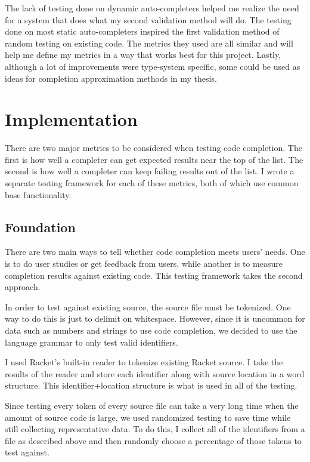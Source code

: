 \documentclass[ms,electronic,twosidetoc,letterpaper,chaptercenter,parttop,lol,lof,lot]{byumsphd}
\begin{document}
The lack of testing done on dynamic auto-completers helped me realize the need for a system that does what my second validation method will do. The testing done on most static auto-completers inspired the first validation method of random testing on existing code. The metrics they used are all similar and will help me define my metrics in a way that works best for this project. Lastly, although a lot of improvements were type-system specific, some could be used as ideas for completion approximation methods in my thesis.

\chapter{Implementation}

There are two major metrics to be considered when testing code completion. The first is how well a completer can get expected results near the top of the list. The second is how well a completer can keep failing results out of the list. I wrote a separate testing framework for each of these metrics, both of which use common base functionality.

\section{Foundation}

There are two main ways to tell whether code completion meets users' needs. One is to do user studies or get feedback from users, while another is to measure completion results against existing code. This testing framework takes the second approach.

In order to test against existing source, the source file must be tokenized. One way to do this is just to delimit on whitespace. However, since it is uncommon for data such as numbers and strings to use code completion, we decided to use the language grammar to only test valid identifiers.

I used Racket's built-in reader to tokenize existing Racket source. I take the results of the reader and store each identifier along with source location in a word structure. This identifier+location structure is what is used in all of the testing.

Since testing every token of every source file can take a very long time when the amount of source code is large, we used randomized testing to save time while still collecting representative data. To do this, I collect all of the identifiers from a file as described above and then randomly choose a percentage of those tokens to test against.
\end{document}
